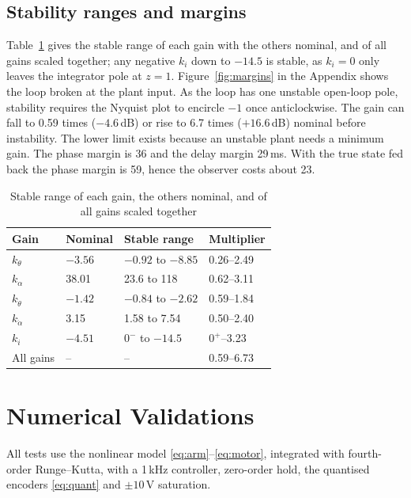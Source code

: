 \subsection{Stability ranges and margins}
\begin{rw}
Table~\ref{tab:ranges} gives the stable range of each gain with the others nominal, and of all gains scaled together; any negative $k_i$ down to $-14.5$ is stable, as $k_i=0$ only leaves the integrator pole at $z=1$. Figure~\ref{fig:margins} in the Appendix shows the loop broken at the plant input. As the loop has one unstable open-loop pole, stability requires the Nyquist plot to encircle $-1$ once anticlockwise. The gain can fall to 0.59 times ($-4.6$\,dB) or rise to 6.7 times ($+16.6$\,dB) nominal before instability. The lower limit exists because an unstable plant needs a minimum gain. The phase margin is 36\textdegree{} and the delay margin 29\,ms. With the true state fed back the phase margin is 59\textdegree, hence the observer costs about 23\textdegree{}.
\end{rw}

\begin{table}[t]
\caption{Stable range of each gain, the others nominal, and of all gains scaled together}\label{tab:ranges}
\centering\footnotesize
\begin{tabular}{llll}
\hline
Gain & Nominal & Stable range & Multiplier\\ \hline
$k_\theta$ & $-3.56$ & $-0.92$ to $-8.85$ & 0.26--2.49\\
$k_\alpha$ & 38.01 & 23.6 to 118 & 0.62--3.11\\
$k_{\dot\theta}$ & $-1.42$ & $-0.84$ to $-2.62$ & 0.59--1.84\\
$k_{\dot\alpha}$ & 3.15 & 1.58 to 7.54 & 0.50--2.40\\
$k_i$ & $-4.51$ & $0^-$ to $-14.5$ & $0^+$--3.23\\
All gains & -- & -- & 0.59--6.73\\
\hline
\end{tabular}
\end{table}

\section{Numerical Validations}
\begin{rw}
All tests use the nonlinear model \eqref{eq:arm}--\eqref{eq:motor}, integrated with fourth-order Runge--Kutta, with a 1\,kHz controller, zero-order hold, the quantised encoders \eqref{eq:quant} and $\pm10$\,V saturation.
\end{rw}

